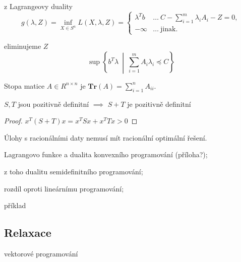 \noindent z Lagrangeovy duality
$$
    g(\lambda, Z) = \inf_{X \in S^n} L(X, \lambda, Z) = 
    \begin{cases}
        \lambda^T b & \dots\ C - \sum_{i=1}^m \lambda_i A_i - Z = 0, \\
        -\infty     & \dots\ \text{jinak.}
    \end{cases}
$$

\noindent eliminujeme $Z$
$$
    \sup \left\{ b^T \lambda\ \middle|\ \sum_{i=1}^m A_i \lambda_i \preceq C \right\}
$$






Stopa matice $A \in R^{n \times n}$ je $\textbf{Tr}(A) = \sum_{i=1}^n A_{ii}$.

\begin{vt}
$S, T$ jsou pozitivně definitní $\implies$ $S + T$ je pozitivně definitní
\end{vt}

\begin{proof}
$x^T (S+T) x = x^T S x + x^T T x > 0$
\end{proof}


Úlohy s racionálními daty nemusí mít racionální optimální řešení.


\noindent Lagrangovo funkce a dualita konvexního programování (příloha?);

\noindent z toho dualitu semidefinitního programování;

\noindent rozdíl oproti lineárnímu programování;

\noindent příklad

\subsection*{Relaxace}
\noindent vektorové programování

